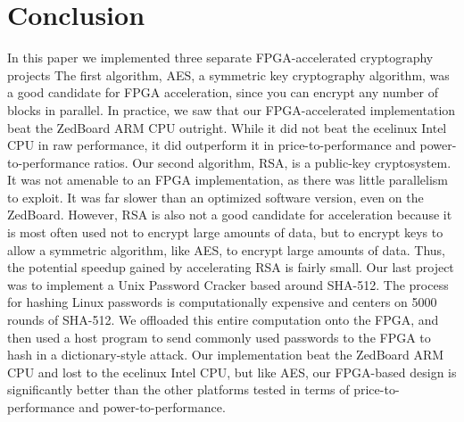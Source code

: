 \section{Conclusion}

In this paper we implemented three separate FPGA-accelerated cryptography projects
The first algorithm, AES, a symmetric key cryptography algorithm, was a good candidate for FPGA acceleration,
since you can encrypt any number of blocks in parallel.
In practice, we saw that our FPGA-accelerated implementation beat the ZedBoard ARM CPU outright.
While it did not beat the ecelinux Intel CPU in raw performance, it did outperform it in price-to-performance and power-to-performance ratios.
Our second algorithm, RSA, is a public-key cryptosystem.
It was not amenable to an FPGA implementation, as there was little parallelism to exploit.
It was far slower than an optimized software version, even on the ZedBoard.
However, RSA is also not a good candidate for acceleration because it is most often used not to encrypt large amounts of data, but to encrypt keys to allow a
symmetric algorithm, like AES, to encrypt large amounts of data.
Thus, the potential speedup gained by accelerating RSA is fairly small.
Our last project was to implement a Unix Password Cracker based around SHA-512.
The process for hashing Linux passwords is computationally expensive and centers on 5000 rounds of SHA-512.
We offloaded this entire computation onto the FPGA, and then used a host program to send commonly used passwords to the FPGA to hash in a dictionary-style attack.
Our implementation beat the ZedBoard ARM CPU and lost to the ecelinux Intel CPU, but like AES, our FPGA-based
design is significantly better than the other platforms tested in terms of price-to-performance and
power-to-performance.
